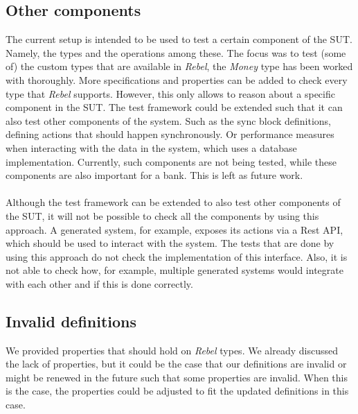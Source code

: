 \subsection*{Other components}
The current setup is intended to be used to test a certain component of the SUT. Namely, the types and the operations among these. The focus was to test (some of) the custom types that are available in \textit{Rebel}, the \textit{Money} type has been worked with thoroughly. More specifications and properties can be added to check every type that \textit{Rebel} supports. However, this only allows to reason about a specific component in the SUT. The test framework could be extended such that it can also test other components of the system. Such as the sync block definitions, defining actions that should happen synchronously. Or performance measures when interacting with the data in the system, which uses a database implementation. Currently, such components are not being tested, while these components are also important for a bank. This is left as future work.\\
\\
Although the test framework can be extended to also test other components of the SUT, it will not be possible to check all the components by using this approach. A generated system, for example, exposes its actions via a Rest API, which should be used to interact with the system. The tests that are done by using this approach do not check the implementation of this interface. Also, it is not able to check how, for example, multiple generated systems would integrate with each other and if this is done correctly.

\subsection*{Invalid definitions}
We provided properties that should hold on \textit{Rebel} types. We already discussed the lack of properties, but it could be the case that our definitions are invalid or might be renewed in the future such that some properties are invalid. When this is the case, the properties could be adjusted to fit the updated definitions in this case.

